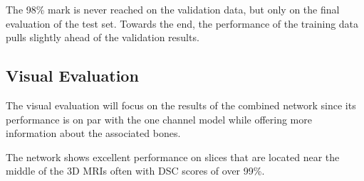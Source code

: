 The 98\% mark is never reached on the validation data, but only on the final evaluation of the test set. Towards the end, the performance of the training data pulls slightly ahead of the validation results.

\subsection{Visual Evaluation}

The visual evaluation will focus on the results of the combined network since its performance is on par with the one channel model while offering more information about the associated bones.

The network shows excellent performance on slices that are located near the middle of the 3D MRIs often with DSC scores of over 99\%.

